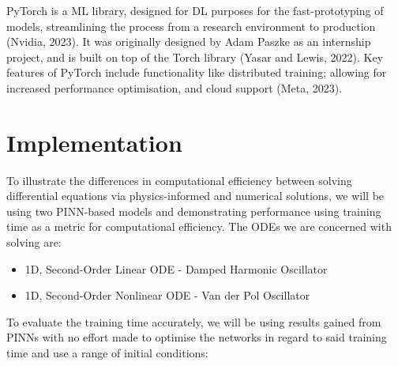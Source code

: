\documentclass[12pt, openany]{book}
\begin{document}
PyTorch is a ML library, designed for DL purposes for the fast-prototyping of models, streamlining the process from a research environment to production (Nvidia, 2023). It was originally designed by Adam Paszke as an internship project, and is built on top of the Torch library (Yasar and Lewis, 2022). Key features of PyTorch include functionality like distributed training; allowing for increased performance optimisation, and cloud support (Meta, 2023).


\chapter{Implementation}

To illustrate the differences in computational efficiency between solving differential equations via physics-informed and numerical solutions, we will be using two PINN-based models and demonstrating performance using training time as a metric for computational efficiency. The ODEs we are concerned with solving are:

\begin{itemize}
    \item 1D, Second-Order Linear ODE - Damped Harmonic Oscillator
    \item 1D, Second-Order Nonlinear ODE - Van der Pol Oscillator
\end{itemize}

To evaluate the training time accurately, we will be using results gained from PINNs with no effort made to optimise the networks in regard to said training time and use a range of initial conditions:
\end{document}

